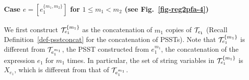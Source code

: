 \paragraph{Case $e = [e_1^{\{m_1,m_2\}}]$ for $1 \le m_1 < m_2$ (see Fig.~\ref{fig-reg2pfa-4})} We first construct $\mathcal{T}^{\{m_1\}}_{e_1}$ as the concatenation of $m_1$ copies of $\mathcal{T}_{e_1}$ (Recall Definition~\ref{def-psstconcat} for the concatenation of PSSTs). Note that $\mathcal{T}^{\{m_1\}}_{e_1}$ is different from $\mathcal{T}_{e_1^{m_1}}$, the PSST constructed from $e_1^{m_1}$, the concatenation of the expression $e_1$ for $m_1$ times. In particular, the set of string variables in $\mathcal{T}^{\{m_1\}}_{e_1}$ is $X_{e_1}$, which is different from that of $\mathcal{T}_{e_1^{m_1}}$. 

